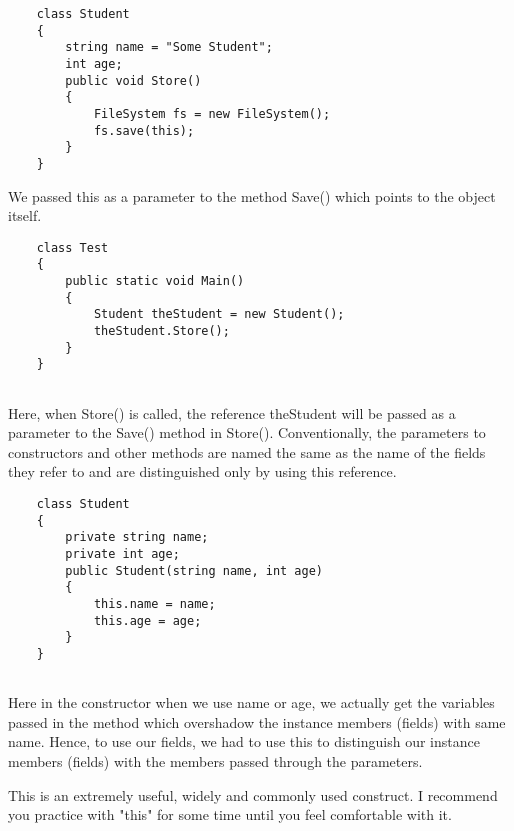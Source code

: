\begin{lstlisting}
    class Student
    {
        string name = "Some Student";
        int age;
        public void Store()
        {
            FileSystem fs = new FileSystem();
            fs.save(this);
        }
    }    
\end{lstlisting}

We passed this as a parameter to the method Save() which points to the object itself.

\begin{lstlisting}
    class Test
    {
        public static void Main()
        {
            Student theStudent = new Student();
            theStudent.Store();
        }
    }
        
\end{lstlisting}

Here, when Store() is called, the reference theStudent will be passed as a parameter to the Save() method in Store().
Conventionally, the parameters to constructors and other methods are named the same as the name of the fields
they refer to and are distinguished only by using this reference.

\begin{lstlisting}
    class Student
    {
        private string name;
        private int age;
        public Student(string name, int age)
        {
            this.name = name;
            this.age = age;
        }
    }
        
\end{lstlisting}

Here in the constructor when we use name or age, we actually get the variables passed in the method which
overshadow the instance members (fields) with same name. Hence, to use our fields, we had to use this to
distinguish our instance members (fields) with the members passed through the parameters.

This is an extremely useful, widely and commonly used construct. I recommend you practice with "this" for some
time until you feel comfortable with it.